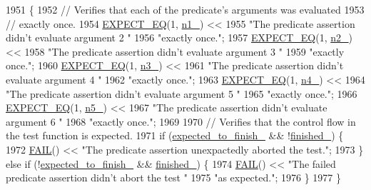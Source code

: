 \begin{DoxyCode}
1951                           \{
1952     \textcolor{comment}{// Verifies that each of the predicate's arguments was evaluated}
1953     \textcolor{comment}{// exactly once.}
1954     \hyperlink{gtest_8h_a4159019abda84f5366acdb7604ff220a}{EXPECT\_EQ}(1, \hyperlink{classPredicate5Test_a356c8e361185b234a417ed895eb14e38}{n1\_}) <<
1955         \textcolor{stringliteral}{"The predicate assertion didn't evaluate argument 2 "}
1956         \textcolor{stringliteral}{"exactly once."};
1957     \hyperlink{gtest_8h_a4159019abda84f5366acdb7604ff220a}{EXPECT\_EQ}(1, \hyperlink{classPredicate5Test_a5bf48ba65b7baf20abe1d2af90779ce0}{n2\_}) <<
1958         \textcolor{stringliteral}{"The predicate assertion didn't evaluate argument 3 "}
1959         \textcolor{stringliteral}{"exactly once."};
1960     \hyperlink{gtest_8h_a4159019abda84f5366acdb7604ff220a}{EXPECT\_EQ}(1, \hyperlink{classPredicate5Test_a63723efb915dbf418c31b97b64dabc0e}{n3\_}) <<
1961         \textcolor{stringliteral}{"The predicate assertion didn't evaluate argument 4 "}
1962         \textcolor{stringliteral}{"exactly once."};
1963     \hyperlink{gtest_8h_a4159019abda84f5366acdb7604ff220a}{EXPECT\_EQ}(1, \hyperlink{classPredicate5Test_a5d66aa58badddc8d3d8070a93c0558d6}{n4\_}) <<
1964         \textcolor{stringliteral}{"The predicate assertion didn't evaluate argument 5 "}
1965         \textcolor{stringliteral}{"exactly once."};
1966     \hyperlink{gtest_8h_a4159019abda84f5366acdb7604ff220a}{EXPECT\_EQ}(1, \hyperlink{classPredicate5Test_a96badba6366235a2771b27ea014bd9ce}{n5\_}) <<
1967         \textcolor{stringliteral}{"The predicate assertion didn't evaluate argument 6 "}
1968         \textcolor{stringliteral}{"exactly once."};
1969 
1970     \textcolor{comment}{// Verifies that the control flow in the test function is expected.}
1971     \textcolor{keywordflow}{if} (\hyperlink{classPredicate5Test_aa502b7a330cc5c64785ff59aad3ef180}{expected\_to\_finish\_} && !\hyperlink{classPredicate5Test_a5003aada64accf06cdb28b1ff1797353}{finished\_}) \{
1972       \hyperlink{gtest_8h_a3e26a8d27caa386ed0ea7ce9d5b7c4ed}{FAIL}() << \textcolor{stringliteral}{"The predicate assertion unexpactedly aborted the test."};
1973     \} \textcolor{keywordflow}{else} \textcolor{keywordflow}{if} (!\hyperlink{classPredicate5Test_aa502b7a330cc5c64785ff59aad3ef180}{expected\_to\_finish\_} && \hyperlink{classPredicate5Test_a5003aada64accf06cdb28b1ff1797353}{finished\_}) \{
1974       \hyperlink{gtest_8h_a3e26a8d27caa386ed0ea7ce9d5b7c4ed}{FAIL}() << \textcolor{stringliteral}{"The failed predicate assertion didn't abort the test "}
1975                 \textcolor{stringliteral}{"as expected."};
1976     \}
1977   \}
\end{DoxyCode}


